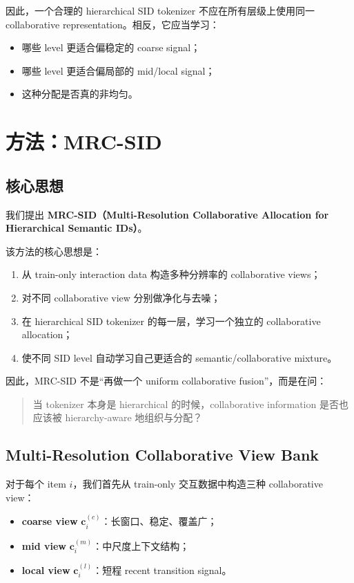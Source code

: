 \documentclass[11pt]{article}
\begin{document}
因此，一个合理的 hierarchical SID tokenizer 不应在所有层级上使用同一 collaborative representation。相反，它应当学习：
\begin{itemize}
  \item 哪些 level 更适合偏稳定的 coarse signal；
  \item 哪些 level 更适合偏局部的 mid/local signal；
  \item 这种分配是否真的非均匀。
\end{itemize}

\section{方法：MRC-SID}

\subsection{核心思想}

我们提出 \textbf{MRC-SID（Multi-Resolution Collaborative Allocation for Hierarchical Semantic IDs）}。

该方法的核心思想是：
\begin{enumerate}
  \item 从 train-only interaction data 构造多种分辨率的 collaborative views；
  \item 对不同 collaborative view 分别做净化与去噪；
  \item 在 hierarchical SID tokenizer 的每一层，学习一个独立的 collaborative allocation；
  \item 使不同 SID level 自动学习自己更适合的 semantic/collaborative mixture。
\end{enumerate}

因此，MRC-SID 不是“再做一个 uniform collaborative fusion”，而是在问：
\begin{quote}
当 tokenizer 本身是 hierarchical 的时候，collaborative information 是否也应该被 hierarchy-aware 地组织与分配？
\end{quote}

\subsection{Multi-Resolution Collaborative View Bank}

对于每个 item $i$，我们首先从 train-only 交互数据中构造三种 collaborative view：
\begin{itemize}
  \item \textbf{coarse view} $\mathbf{c}_i^{(c)}$：长窗口、稳定、覆盖广；
  \item \textbf{mid view} $\mathbf{c}_i^{(m)}$：中尺度上下文结构；
  \item \textbf{local view} $\mathbf{c}_i^{(l)}$：短程 recent transition signal。
\end{itemize}
\end{document}

